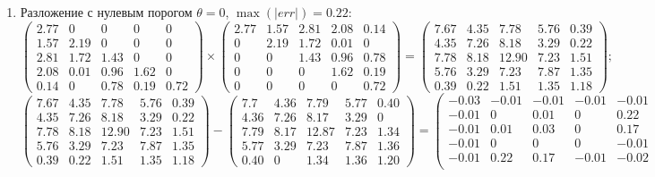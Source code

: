 \begin{enumerate}
    \item Разложение с нулевым порогом $\theta=0$, $\max(|err|) = 0.22$:
    $$\begin{pmatrix}
        2.77&  0   & 0   & 0   & 0\\
        1.57&  2.19& 0   & 0   & 0\\
        2.81&  1.72& 1.43& 0   & 0\\
        2.08&  0.01& 0.96& 1.62& 0\\
        0.14&  0   & 0.78& 0.19& 0.72
    \end{pmatrix} \times
    \begin{pmatrix}
        2.77&  1.57&  2.81&  2.08&   0.14\\
        0   &  2.19&  1.72&  0.01&   0   \\
        0   &  0   &  1.43&  0.96&   0.78\\
        0   &  0   &  0   &  1.62&   0.19\\
        0   &  0   &  0   &  0   &   0.72
    \end{pmatrix} =
    \begin{pmatrix}
        7.67& 4.35&  7.78& 5.76& 0.39\\
        4.35& 7.26&  8.18& 3.29& 0.22\\
        7.78& 8.18& 12.90& 7.23& 1.51\\
        5.76& 3.29&  7.23& 7.87& 1.35\\
        0.39& 0.22&  1.51& 1.35& 1.18
    \end{pmatrix};$$
    $$\begin{pmatrix}
        7.67& 4.35&  7.78& 5.76& 0.39\\
        4.35& 7.26&  8.18& 3.29& 0.22\\
        7.78& 8.18& 12.90& 7.23& 1.51\\
        5.76& 3.29&  7.23& 7.87& 1.35\\
        0.39& 0.22&  1.51& 1.35& 1.18
    \end{pmatrix} -
    \begin{pmatrix}
        7.7  & 4.36 & 7.79  & 5.77 & 0.40 \\
        4.36 & 7.26 & 8.17  & 3.29 & 0    \\
        7.79 & 8.17 & 12.87 & 7.23 & 1.34 \\
        5.77 & 3.29 & 7.23  & 7.87 & 1.36 \\
        0.40 & 0    & 1.34  & 1.36 & 1.20
    \end{pmatrix} =
    \begin{pmatrix}
        -0.03& -0.01&  -0.01&  -0.01&  -0.01\\
        -0.01&  0   &   0.01&   0   &   0.22\\
        -0.01&  0.01&   0.03&   0   &   0.17\\
        -0.01&  0   &   0   &   0   &  -0.01\\
        -0.01&  0.22&   0.17&  -0.01&  -0.02\\
    \end{pmatrix};$$


\end{enumerate}
